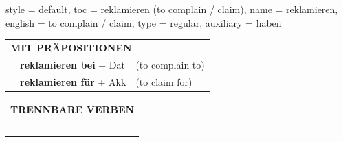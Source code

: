 \begin{verbentry}{
  style = {default},
  toc = {reklamieren (to complain / claim)},
  name = {reklamieren},
  english = {to complain / claim},
  type = {regular},
  auxiliary = {haben}
}
\vspace{10pt}

\begin{tabular}{lll}
\multicolumn{3}{l}{\textbf{MIT PRÄPOSITIONEN}}\\
& \textbf{reklamieren bei} + Dat & (to complain to)\\
& \textbf{reklamieren für} + Akk & (to claim for)\\
\end{tabular}
\hfill
\begin{tabular}{lll}
\multicolumn{3}{l}{\textbf{TRENNBARE VERBEN}}\\
& \textbf{---} & \\
\end{tabular}
\vspace{-5pt}
\end{verbentry}

